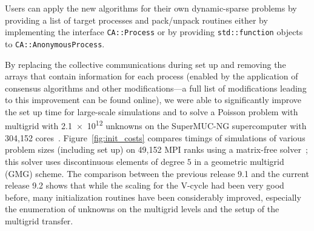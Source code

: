 \documentclass{ansarticle-preprint}
\begin{document}
Users can apply the new algorithms for their own dynamic-sparse problems by
providing a list of target
processes and pack/unpack routines either by implementing the interface
\texttt{CA::\allowbreak Process} or by providing \texttt{std::function}
objects to \texttt{CA::AnonymousProcess}.

By replacing the collective communications during set up and removing the arrays
that contain information for each process (enabled by the application of consensus
algorithms and other modifications---a full list of modifications leading to this
improvement can be found online), we were able to significantly
improve the set up
time for large-scale simulations and to solve a Poisson problem with multigrid
with \num{2.1e12} unknowns on the SuperMUC-NG supercomputer with 304,152
cores~\cite{dealII2020design,Arndt2020sppexa}.
Figure~\ref{fig:init_costs} compares timings of simulations of various problem
sizes (including set up) on 49,152 MPI ranks using a matrix-free
solver~\cite{Arndt2020sppexa,KronbichlerKormann2019,KronbichlerWall2018}; this solver uses discontinuous elements of
degree $5$ in a geometric multigrid (GMG) scheme. The comparison between the previous release 9.1
and the current release 9.2 shows that while the scaling for the V-cycle had been
very good before, many initialization routines have been considerably
improved, especially the enumeration of unknowns on the multigrid levels and
the setup of the multigrid transfer.

\tableinit
\end{document}
